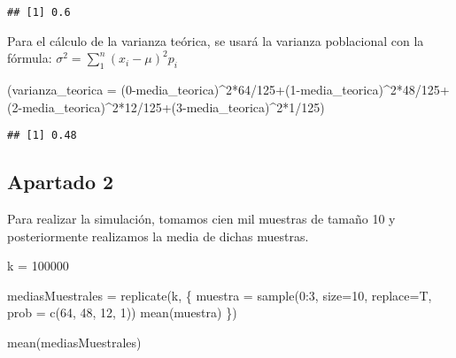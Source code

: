 \documentclass[
]{article}
\newenvironment{Shaded}{\begin{snugshade}}{\end{snugshade}}
\newcommand{\AttributeTok}[1]{\textcolor[rgb]{0.77,0.63,0.00}{#1}}
\newcommand{\DecValTok}[1]{\textcolor[rgb]{0.00,0.00,0.81}{#1}}
\newcommand{\FunctionTok}[1]{\textcolor[rgb]{0.00,0.00,0.00}{#1}}
\newcommand{\NormalTok}[1]{#1}
\newcommand{\OtherTok}[1]{\textcolor[rgb]{0.56,0.35,0.01}{#1}}
\newcommand{\SpecialCharTok}[1]{\textcolor[rgb]{0.00,0.00,0.00}{#1}}
\begin{document}
\begin{verbatim}
## [1] 0.6
\end{verbatim}

Para el cálculo de la varianza teórica, se usará la varianza poblacional
con la fórmula: \(\sigma^2=\sum_{1}^{n} (x_{i}-\mu)^2p_{i}\)

\begin{Shaded}
\begin{Highlighting}[]
\NormalTok{(}\AttributeTok{varianza\_teorica =}\NormalTok{ (}\DecValTok{0}\SpecialCharTok{{-}}\NormalTok{media\_teorica)}\SpecialCharTok{\^{}}\DecValTok{2}\SpecialCharTok{*}\DecValTok{64}\SpecialCharTok{/}\DecValTok{125}\SpecialCharTok{+}\NormalTok{(}\DecValTok{1}\SpecialCharTok{{-}}\NormalTok{media\_teorica)}\SpecialCharTok{\^{}}\DecValTok{2}\SpecialCharTok{*}\DecValTok{48}\SpecialCharTok{/}\DecValTok{125}\SpecialCharTok{+}\NormalTok{(}\DecValTok{2}\SpecialCharTok{{-}}\NormalTok{media\_teorica)}\SpecialCharTok{\^{}}\DecValTok{2}\SpecialCharTok{*}\DecValTok{12}\SpecialCharTok{/}\DecValTok{125}\SpecialCharTok{+}\NormalTok{(}\DecValTok{3}\SpecialCharTok{{-}}\NormalTok{media\_teorica)}\SpecialCharTok{\^{}}\DecValTok{2}\SpecialCharTok{*}\DecValTok{1}\SpecialCharTok{/}\DecValTok{125}\NormalTok{)}
\end{Highlighting}
\end{Shaded}

\begin{verbatim}
## [1] 0.48
\end{verbatim}

\hypertarget{apartado-2}{%
\subsection{Apartado 2}\label{apartado-2}}

Para realizar la simulación, tomamos cien mil muestras de tamaño 10 y
posteriormente realizamos la media de dichas muestras.

\begin{Shaded}
\begin{Highlighting}[]
\NormalTok{k }\OtherTok{=} \DecValTok{100000}

\NormalTok{mediasMuestrales }\OtherTok{=} \FunctionTok{replicate}\NormalTok{(k, \{ }
\NormalTok{  muestra }\OtherTok{=} \FunctionTok{sample}\NormalTok{(}\DecValTok{0}\SpecialCharTok{:}\DecValTok{3}\NormalTok{, }\AttributeTok{size=}\DecValTok{10}\NormalTok{, }\AttributeTok{replace=}\NormalTok{T, }\AttributeTok{prob =} \FunctionTok{c}\NormalTok{(}\DecValTok{64}\NormalTok{, }\DecValTok{48}\NormalTok{, }\DecValTok{12}\NormalTok{, }\DecValTok{1}\NormalTok{))}
  \FunctionTok{mean}\NormalTok{(muestra)}
\NormalTok{\})}

\FunctionTok{mean}\NormalTok{(mediasMuestrales)}
\end{Highlighting}
\end{Shaded}
\end{document}
